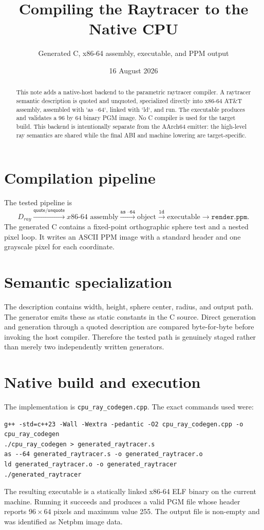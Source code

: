 \documentclass[11pt,a4paper]{article}
\title{Compiling the Raytracer to the Native CPU}
\author{Generated C, x86-64 assembly, executable, and PPM output}
\date{16 August 2026}
\begin{document}
\maketitle
\begin{abstract}
This note adds a native-host backend to the parametric raytracer compiler. A raytracer semantic description is quoted and unquoted, specialized directly into x86-64 AT\&T assembly, assembled with `as --64`, linked with `ld`, and run. The executable produces and validates a 96 by 64 binary PGM image. No C compiler is used for the target build. This backend is intentionally separate from the AArch64 emitter: the high-level ray semantics are shared while the final ABI and machine lowering are target-specific.
\end{abstract}
\section{Compilation pipeline}
The tested pipeline is
\[
D_{ray}\xrightarrow{\mathsf{quote}/\mathsf{unquote}}x86\text{-}64\text{ assembly}
\xrightarrow{\texttt{as --64}}\text{object}
\xrightarrow{\texttt{ld}}\text{executable}
\xrightarrow{}\texttt{render.ppm}.
\]
The generated C contains a fixed-point orthographic sphere test and a nested pixel loop. It writes an ASCII PPM image with a standard header and one grayscale pixel for each coordinate.

\section{Semantic specialization}
The description contains width, height, sphere center, radius, and output path. The generator emits these as static constants in the C source. Direct generation and generation through a quoted description are compared byte-for-byte before invoking the host compiler. Therefore the tested path is genuinely staged rather than merely two independently written generators.

\section{Native build and execution}
The implementation is \texttt{cpu\_ray\_codegen.cpp}. The exact commands used were:
\begin{verbatim}
g++ -std=c++23 -Wall -Wextra -pedantic -O2 cpu_ray_codegen.cpp -o cpu_ray_codegen
./cpu_ray_codegen > generated_raytracer.s
as --64 generated_raytracer.s -o generated_raytracer.o
ld generated_raytracer.o -o generated_raytracer
./generated_raytracer
\end{verbatim}
The resulting executable is a statically linked x86-64 ELF binary on the current machine. Running it succeeds and produces a valid PGM file whose header reports $96\times64$ pixels and maximum value 255. The output file is non-empty and was identified as Netpbm image data.
\end{document}
